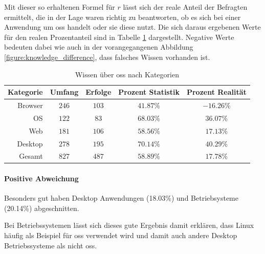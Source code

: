 \documentclass[a4paper]{article}
\begin{document}
                Mit dieser so erhaltenen Formel für $r$ lässt sich der reale Anteil der Befragten ermittelt, die in der Lage waren richtig zu beantworten, ob es sich bei einer Anwendung um \gls{oss} handelt oder sie diese nutzt. Die sich daraus ergebenen Werte für den realen Prozentanteil sind in Tabelle \ref{table:knowledge_by_category} dargestellt. Negative Werte bedeuten dabei wie auch in der vorangegangenen Abbildung \ref{figure:knowledge_difference}, dass falsches Wissen vorhanden ist.
                
                
                \begin{table}
                    \centering
                    \begin{tabular}{rcccc}
                        Kategorie & Umfang & Erfolge & Prozent Statistik & Prozent Realität \\\hline\hline
                        Browser & $246$ & $103$ & $41.87\%$ & $-16.26\%$\\
                        OS & $122$ & $83$ & $68.03\%$ & $36.07\%$\\
                        Web & $181$ & $106$ & $58.56\%$ & $17.13\%$\\
                        Desktop & $278$ & $195$ & $70.14\%$ & $40.29\%$\\\hline
                        Gesamt & $827$ & $487$ & $58.89\%$ & $17.78\%$
                    \end{tabular}
                    \caption{Wissen über \gls{oss} nach Kategorien}
                    \label{table:knowledge_by_category}
                \end{table}
                
                \paragraph{Positive Abweichung}
                    Besonders gut haben Desktop Anwendungen ({\scriptsize 18.03\%}) und Betriebsysteme ({\scriptsize 20.14\%}) abgeschnitten.
                    
                    Bei Betriebssystemen lässt sich dieses gute Ergebnis damit erklären, dass Linux häufig als Beispiel für \gls{oss} verwendet wird und damit auch andere Desktop Betriebssysteme als nicht \gls{oss}.%
                    
                
\end{document}
